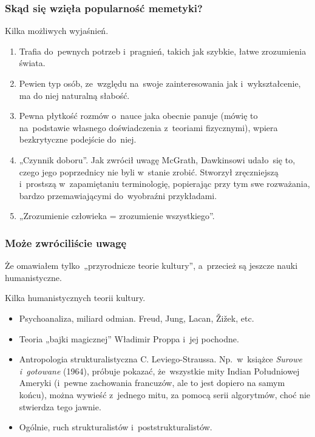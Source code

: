 \documentclass[10pt,t]{beamer}
\begin{document}
\begin{frame}
  \frametitle{Skąd się wzięła popularność memetyki?}


  Kilka możliwych wyjaśnień.
  \begin{enumerate}
    \RaggedRight

  \item Trafia do~pewnych potrzeb i~pragnień, takich jak szybkie,
    łatwe zrozumienia świata.

  \item Pewien typ osób, ze~względu na~swoje zainteresowania jak
    i~wykształcenie, ma do niej naturalną słabość.

  \item Pewna płytkość rozmów o~nauce jaka obecnie panuje (mówię to
    na~podstawie własnego doświadczenia z~teoriami fizycznymi),
    wpiera bezkrytyczne podejście do~niej.

  \item„Czynnik doboru”. Jak zwrócił uwagę McGrath, Dawkinsowi
    udało~się to, czego jego poprzednicy nie byli w~stanie zrobić.
    Stworzył zręczniejszą i~prostszą w~zapamiętaniu terminologię,
    popierając przy tym swe rozważania, bardzo przemawiającymi
    do~wyobraźni przykładami.

  \item „Zrozumienie człowieka = zrozumienie wszystkiego”.

  \end{enumerate}

\end{frame}





\begin{frame}
  \frametitle{Może zwróciliście uwagę}

  Że omawiałem tylko~„przyrodnicze teorie kultury”, a~przecież są jeszcze
  nauki humanistyczne.


  Kilka humanistycznych teorii kultury.
  \begin{itemize}
    \RaggedRight

  \item Psychoanaliza, miliard odmian. Freud, Jung, Lacan,
    \v{Z}i\v{z}ek, etc.

  \item Teoria „bajki magicznej” Władimir Proppa i~jej pochodne.

  \item Antropologia strukturalistyczna C. Leviego-Straussa.
    Np.~w~książce \textit{Surowe i~gotowane} (1964), próbuje
    pokazać, że~wszystkie mity Indian Południowej Ameryki (i~pewne
    zachowania francuzów, ale to jest dopiero na samym końcu), można
    wywieść z~jednego mitu, za pomocą serii algorytmów, choć nie stwierdza
    tego jawnie.

  \item Ogólnie, ruch strukturalistów i~poststrukturalistów.

  \end{itemize}

\end{frame}
\end{document}

